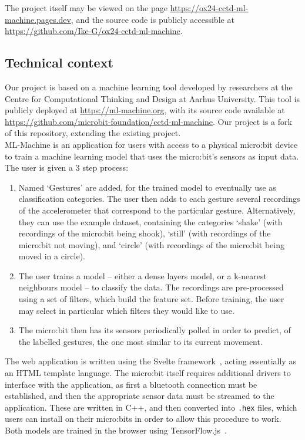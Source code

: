 \documentclass{article}
\begin{document}
The project itself may be viewed on the page \url{https://ox24-cctd-ml-machine.pages.dev}, and the source code is publicly accessible at \url{https://github.com/Ike-G/ox24-cctd-ml-machine}.

\subsection{Technical context}%
\label{subsec:context}

Our project is based on a machine learning tool developed by researchers at the Centre for Computational Thinking and Design at Aarhus University. This tool is publicly deployed at \url{https://ml-machine.org}, with its source code available at \url{https://github.com/microbit-foundation/cctd-ml-machine}. Our project is a fork of this repository, extending the existing project. \\

ML-Machine is an application for users with access to a physical micro:bit device to train a machine learning model that uses the micro:bit's sensors as input data. The user is given a 3 step process:
\begin{enumerate}
        \item Named `Gestures' are added, for the trained model to eventually use as classification categories. The user then adds to each gesture several recordings of the accelerometer that correspond to the particular gesture. Alternatively, they can use the example dataset, containing the categories `shake' (with recordings of the micro:bit being shook), `still' (with recordings of the micro:bit not moving), and `circle' (with recordings of the micro:bit being moved in a circle).
  \item The user trains a model -- either a dense layers model, or a k-nearest neighbours model -- to classify the data. The recordings are pre-processed using a set of filters, which build the feature set. Before training, the user may select in particular which filters they would like to use.
        \item The micro:bit then has its sensors periodically polled in order to predict, of the labelled gestures, the one most similar to its current movement.
\end{enumerate}

The web application is written using the Svelte framework~\cite{svelte}, acting essentially as an HTML template language. The micro:bit itself requires additional drivers to interface with the application, as first a bluetooth connection must be established, and then the appropriate sensor data must be streamed to the application. These are written in C++, and then converted into \verb|.hex| files, which users can install on their micro:bits in order to allow this procedure to work. Both models are trained in the browser using TensorFlow.js~\cite{tensorflowjs}. \\
\end{document}

